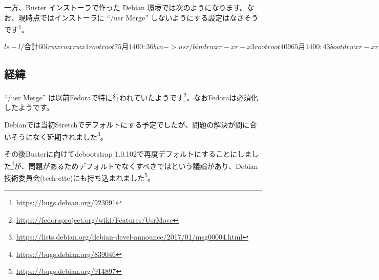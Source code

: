 \documentclass[mingoth,a4paper]{jsarticle}
\begin{document}
一方、Buster インストーラで作った Debian 環境では次のようになります。なお、現時点ではインストーラに ``/usr Merge'' しないようにする設定はなさそうです\footnote{\url{https://bugs.debian.org/923091}}。
\begin{commandline}
$ ls -l /
合計 60
lrwxrwxrwx  1 root root     7  5月 14 00:36 bin -> usr/bin
drwxr-xr-x  3 root root  4096  5月 14 00:43 boot
drwxr-xr-x 17 root root  3160  5月 14 00:56 dev
drwxr-xr-x 67 root root  4096  5月 14 00:56 etc
drwxr-xr-x  3 root root  4096  5月 14 00:43 home
lrwxrwxrwx  1 root root    30  5月 14 00:38 initrd.img -> boot/initrd.img-4.19.0-4-amd64
lrwxrwxrwx  1 root root    30  5月 14 00:38 initrd.img.old -> boot/initrd.img-4.19.0-4-amd64
lrwxrwxrwx  1 root root     7  5月 14 00:36 lib -> usr/lib
lrwxrwxrwx  1 root root     9  5月 14 00:36 lib32 -> usr/lib32
lrwxrwxrwx  1 root root     9  5月 14 00:36 lib64 -> usr/lib64
lrwxrwxrwx  1 root root    10  5月 14 00:36 libx32 -> usr/libx32
drwx------  2 root root 16384  5月 14 00:36 lost+found
drwxr-xr-x  3 root root  4096  5月 14 00:36 media
drwxr-xr-x  2 root root  4096  5月 14 00:36 mnt
drwxr-xr-x  2 root root  4096  5月 14 00:36 opt
dr-xr-xr-x 79 root root     0  5月 14  2019 proc
drwx------  2 root root  4096  5月 14 00:36 root
drwxr-xr-x 15 root root   460  5月 14 00:58 run
lrwxrwxrwx  1 root root     8  5月 14 00:36 sbin -> usr/sbin
drwxr-xr-x  2 root root  4096  5月 14 00:36 srv
dr-xr-xr-x 13 root root     0  5月 14 00:56 sys
drwxrwxrwt  8 root root  4096  5月 14 00:56 tmp
drwxr-xr-x 13 root root  4096  5月 14 00:36 usr
drwxr-xr-x 11 root root  4096  5月 14 00:36 var
lrwxrwxrwx  1 root root    27  5月 14 00:38 vmlinuz -> boot/vmlinuz-4.19.0-4-amd64
lrwxrwxrwx  1 root root    27  5月 14 00:38 vmlinuz.old -> boot/vmlinuz-4.19.0-4-amd64
$ 
\end{commandline}

\subsection{経緯}

``/usr Merge'' は以前Fedoraで特に行われていたようです\footnote{\url{https://fedoraproject.org/wiki/Features/UsrMove}}。なおFedoraは必須化したようです。

Debianでは当初Stretchでデフォルトにする予定でしたが、問題の解決が間に合いそうになく延期されました\footnote{\url{https://lists.debian.org/debian-devel-announce/2017/01/msg00004.html}}。

その後Busterに向けてdebootstrap 1.0.102で再度デフォルトにすることにしました\footnote{\url{https://bugs.debian.org/839046}}が、問題があるためデフォルトでなくすべきではという議論があり、Debian技術委員会(tech-ctte)にも持ち込まれました\footnote{\url{https://bugs.debian.org/914897}}。
\end{document}
